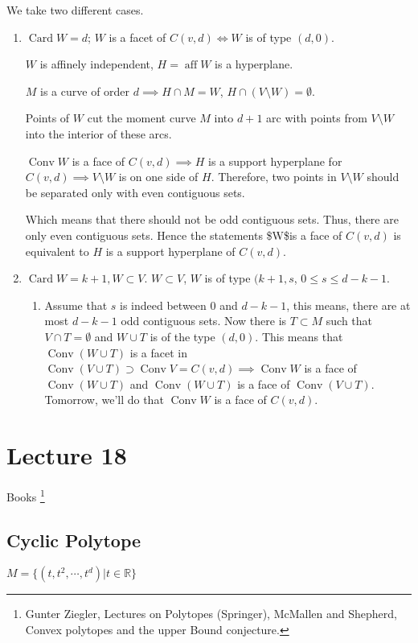\documentclass[11pt]{article}
\def\R{\mathbb{R}}
\def\aff{\operatorname{aff}}
\def\conv{\operatorname{Conv}}
\def\card{\operatorname{Card}}
\begin{document}
{{We take two different cases.

\begin{enumerate}
\item \(\card W = d\); \(W\) is a facet of \(C(v, d) \iff W\) is of type \((d, 0)\).

\(W\) is affinely independent, \(H = \aff W\) is a hyperplane.

\(M\) is a curve of order \(d \implies H \cap M = W\), \(H \cap (V \setminus
       W) = \emptyset\).

Points of \(W\) cut the moment curve \(M\) into \(d+1\) arc with points from \(V
       \setminus W\) into the interior of these arcs.

\(\conv W\) is a face of \(C(v, d) \implies H\) is a support hyperplane for
\(C(v, d) \implies V \setminus W\) is on one side of \(H\). Therefore, two
points in \(V \setminus W\) should be separated only with even contiguous
sets.

Which means that there should not be odd contiguous sets. Thus, there are
only even contiguous sets. Hence the statements \$\conv W\$is a face of
\(C(v, d)\) is equivalent to \(H\) is a support hyperplane of \(C(v, d)\).
\item \(\card W = k+1, W \subset V\). \(W \subset V\), \(W\) is of type \((k+1, s\), \(0
       \le s \le d-k-1\).

\begin{enumerate}
\item Assume that \(s\) is indeed between \(0\) and \(d - k - 1\), this means,
there are at most \(d-k-1\) odd contiguous sets. Now there is \(T \subset
          M\) such that \(V \cap T = \emptyset\) and \(W \cup T\) is of the type \((d,
          0)\). This means that \(\conv (W \cup T)\) is a facet in \(\conv (V \cup
          T) \supset \conv V = C(v, d) \implies \conv W\) is a face of \(\conv (W
          \cup T)\) and \(\conv(W \cup T)\) is a face of \(\conv (V \cup T)\).
Tomorrow, we'll do that \(\conv W\) is a face of \(C(v, d)\).
\end{enumerate}
\end{enumerate}
\section{Lecture 18}
\label{sec:org1762944}
Books \footnote{Gunter Ziegler, Lectures on Polytopes (Springer), McMallen and Shepherd,
Convex polytopes and the upper Bound conjecture.}
\subsection{Cyclic Polytope}
\label{sec:org8d9d596}
\(M = \{(t, t^2, \cdots, t^{d}) \vert t \in \R\}\)

}}
\end{document}
